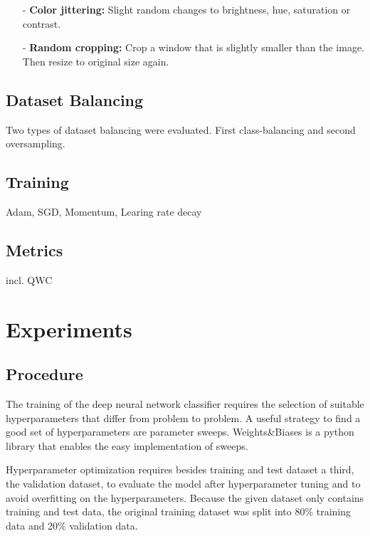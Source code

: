\documentclass{article}
\begin{document}
\begin{itemize}
\begin{itemize}
\begin{figure}[h]
\begin{minipage}[b]{.5\textwidth}
\begin{center}
          \captionsetup{justification=centering}
          \label{fig:IDRiD_graham}
          \end{center}
      \end{minipage}
  \end{figure} 
  \end{itemize}   
  \item[-] \textbf{Color jittering:} Slight random changes to brightness, hue, saturation or contrast.
  \item[-] \textbf{Random cropping:} Crop a window that is slightly smaller than the image. Then resize to original size again.
\end{itemize}
\subsection{Dataset Balancing}
Two types of dataset balancing were evaluated. First class-balancing and second oversampling.
\subsection{Training}
Adam, SGD, Momentum, Learing rate decay
\subsection{Metrics}
incl. QWC
\section{Experiments}
\subsection{Procedure}
The training of the deep neural network classifier requires the selection of suitable hyperparameters that differ from
problem to problem. A useful strategy to find a good set of hyperparameters are parameter sweeps. Weights\&Biases is a 
python library that enables the easy implementation of sweeps. 

Hyperparameter optimization requires besides training and test dataset a third, the validation dataset, to evaluate the
model after hyperparameter tuning and to avoid overfitting on the hyperparameters. Because the given dataset only contains 
training and test data, the original training dataset was split into 80\% training data and 20\% validation data.
\end{document}
